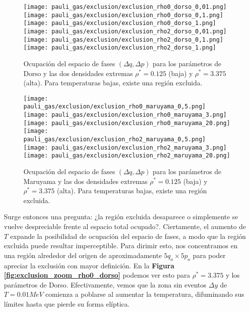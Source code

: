 \begin{figure}[H]
	\centering	%
	\texttt{[image: pauli\_gas/exclusion/exclusion\_rho0\_dorso\_0,01.png]}
	\texttt{[image: pauli\_gas/exclusion/exclusion\_rho0\_dorso\_0,1.png]}
	\texttt{[image: pauli\_gas/exclusion/exclusion\_rho0\_dorso\_1.png]}
	\texttt{[image: pauli\_gas/exclusion/exclusion\_rho2\_dorso\_0,01.png]}
	\texttt{[image: pauli\_gas/exclusion/exclusion\_rho2\_dorso\_0,1.png]}
	\texttt{[image: pauli\_gas/exclusion/exclusion\_rho2\_dorso\_1.png]}
	\caption{Ocupación del espacio de fases $(\Delta q, \Delta p)$ para los parámetros de Dorso y las dos densidades extremas $\rho^*=0.125$ (baja) y $\rho^*=3.375$ (alta).
  Para temperaturas bajas, existe una región excluida.}
	\label{fig:exclusion_dorso}
\end{figure}
\begin{figure}[H]
	\centering	%
	\texttt{[image: pauli\_gas/exclusion/exclusion\_rho0\_maruyama\_0,5.png]}
	\texttt{[image: pauli\_gas/exclusion/exclusion\_rho0\_maruyama\_3.png]}
	\texttt{[image: pauli\_gas/exclusion/exclusion\_rho0\_maruyama\_20.png]}
	\texttt{[image: pauli\_gas/exclusion/exclusion\_rho2\_maruyama\_0,5.png]}
	\texttt{[image: pauli\_gas/exclusion/exclusion\_rho2\_maruyama\_3.png]}
	\texttt{[image: pauli\_gas/exclusion/exclusion\_rho2\_maruyama\_20.png]}
	\caption{Ocupación del espacio de fases $(\Delta q, \Delta p)$ para los parámetros de Maruyama y las dos densidades extremas $\rho^*=0.125$ (baja) y $\rho^*=3.375$ (alta).
  Para temperaturas bajas, existe una región excluida.}
	\label{fig:exclusion_maruyama}
\end{figure}

Surge entonces una pregunta: ¿la región excluida desaparece o simplemente se vuelve despreciable frente al espacio total ocupado?.
Ciertamente, el aumento de $T$ expande la posibilidad de ocupación del espacio de fases, a modo que la región excluida puede resultar imperceptible.
Para dirimir esto, nos concentramos en una región alrededor del origen de aproximadamente $5q_o\times5p_o$ para poder apreciar la exclusión con mayor definición.
En la \textbf{Figura \ref{fig:exclusion_zoom_rho0_dorso}} podemos ver esto para $\rho^*=3.375$ y los parámetros de Dorso.
Efectivamente, vemos que la zona sin eventos $\Delta y$ de $T=0.01MeV$ comienza a poblarse al aumentar la temperatura, difuminando sus límites hasta que pierde
su forma elíptica.


